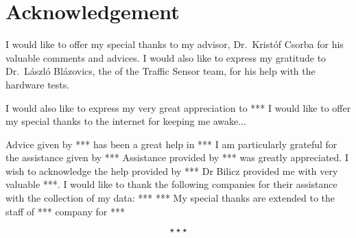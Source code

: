 \chapter*{Acknowledgement}

I would like to offer my special thanks to my advisor, Dr.~Krist{\'o}f Csorba for his valuable comments and advices.
I would also like to express my gratitude to Dr.~L{\'a}szl{\'o} Bl{\'a}zovics, the of the Traffic Sensor team, for his help with the hardware tests.

I would also like to express my very great appreciation to ***
I would like to offer my special thanks to the internet for keeping me awake...

Advice given by *** has been a great help in ***
I am particularly grateful for the assistance given by ***
Assistance provided by *** was greatly appreciated.
I wish to acknowledge the help provided by ***
Dr Bilicz provided me with very valuable ***.
I would like to thank the following companies for their assistance with the collection of my data:
***
***
My special thanks are extended to the staff of *** company for ***

\begin{displaymath}
	\star \star \star
\end{displaymath}
